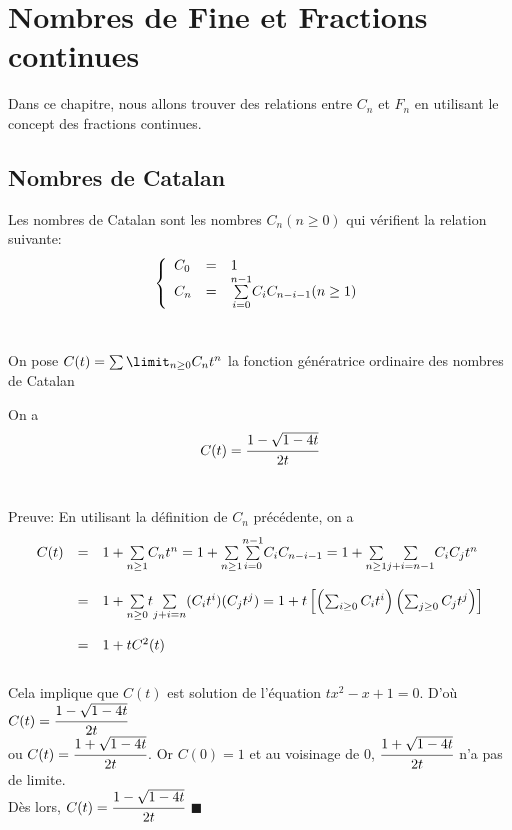 \chapter{Nombres de Fine et Fractions continues}
Dans ce chapitre, nous allons trouver des relations entre $C_{n}$ et $F_{n}$ en utilisant le
concept des fractions continues.
\section{Nombres de Catalan}
\begin{definition}
	\begin{rm}
		Les nombres de Catalan sont les nombres $C_{n} (n \geq 0)$ qui vérifient  la relation suivante:
		\[
			\left \{
			\begin{array}{l l l}
				C_{0} & = & 1                                                            \\
				C_{n} & = & \underset{i=0}{\overset{n-1}{\sum}}C_{i}C_{n-i-1} (n \geq 1)
			\end{array}
			\right.
		\]\vspace{5pt}\\
	\end{rm}
\end{definition}
On pose $C(t)=\sum\limit_{n\geq 0}C_{n}t^{n}$ la fonction génératrice ordinaire des nombres de Catalan
\begin{proposition}
	\begin{rm}
		On a \[C(t)=\cfrac{1-
				\sqrt{1-4t}}{2t}\]\\
	\end{rm}
\end{proposition}
Preuve: En utilisant la définition de $C_{n}$ précédente, on a\\\[
	\begin{array}{r r l}
		C(t) & =       & 1+\underset{n\geq1}{\sum}C_{n}t^n=1+ \underset{n\geq1}{\sum}\underset{i=0}{\overset{n-1}{\sum}}C_{i}C_{n-i-1} = 1+
		\underset{n\geq1}{\sum}\underset{j+i=n-1}{\sum}C_{i}C_{j}t^n                                                                        \\
		     & \text{} &                                                                                                                    \\
		     & =       & 1+\underset{n\geq0}{\sum}t\underset{j+i=n}{\sum}(C_{i}t^i)(C_{j}t^j)
		= 1 +t\left[\left(\sum_{i\geq0}C_{i}t^i\right)\left(\sum_{j\geq0}C_{j}t^j\right)\right]                                             \\
		     & \text{} &                                                                                                                    \\
		     & =       & 1+tC^2(t)
	\end{array}
\]\\
Cela implique que $C(t)$ est solution de l'équation $tx^2-x+1 = 0$. D'où $C(t)=\cfrac{1-\sqrt{1-4t}}{2t}$\\ ou $C(t)=\cfrac{1+\sqrt{1-4t}}{2t}$. Or $C(0)=1
$ et au voisinage de 0, $\cfrac{1+\sqrt{1-4t}}{2t}$ n'a pas de limite.\\
Dès lors, $C(t)=\cfrac{1-\sqrt{1-4t}}{2t}$ \hspace{5pt}$\blacksquare$


